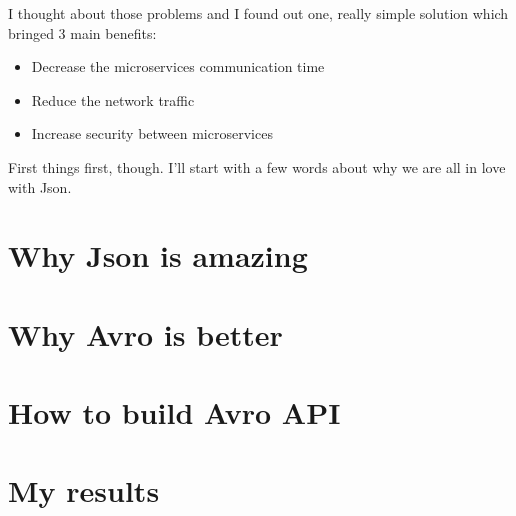 \documentclass[]{article}
\begin{document}
I thought about those problems and I found out one, really simple solution which bringed 3 main benefits:
\begin{itemize}
	\item Decrease the microservices communication time
	\item Reduce the network traffic 
	\item Increase security between microservices
\end{itemize}


First things first, though. I'll start with a few words about why we are all in love with Json.


\section{Why Json is amazing}


\section{Why Avro is better}

\section{How to build Avro API}

\section{My results}
\end{document}
